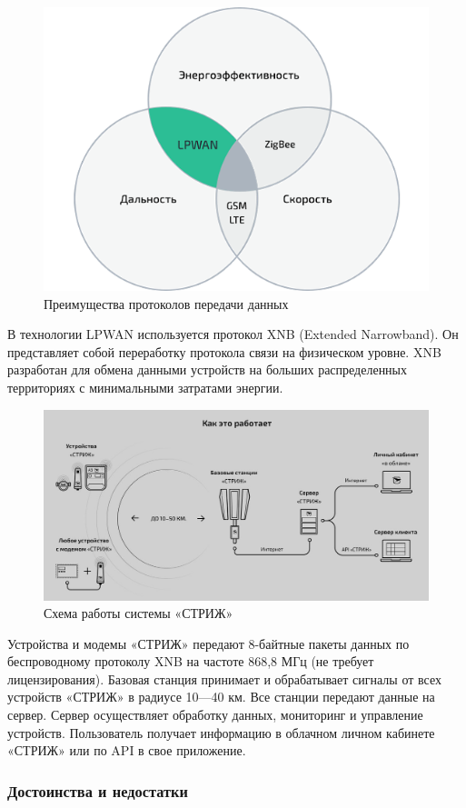 \begin{figure}[H]
	\centering
	\includegraphics[width=0.7\linewidth]{pics/lpwan}
	\caption{Преимущества протоколов передачи данных}
	\label{fig:lpwan}
\end{figure}

В технологии LPWAN используется протокол XNB (Extended Narrowband). Он представляет собой переработку протокола связи на физическом уровне. XNB разработан для обмена данными устройств на больших распределенных территориях с минимальными затратами энергии.

\begin{figure}[H]
	\centering
	\includegraphics[width=0.7\linewidth]{pics/strij}
	\caption{Схема работы системы «СТРИЖ»}
	\label{fig:strij}
\end{figure}

Устройства и модемы «СТРИЖ» передают 8-байтные пакеты данных по беспроводному протоколу XNB на частоте 868,8 МГц (не требует лицензирования). Базовая станция принимает и обрабатывает сигналы от всех устройств «СТРИЖ» в радиусе 10—40 км.  Все станции передают данные на сервер. Сервер осуществляет обработку данных, мониторинг и управление устройств. Пользователь получает информацию в облачном личном кабинете «СТРИЖ» или по API в свое приложение.

\subsubsection{Достоинства и недостатки}

